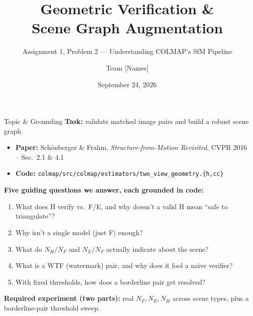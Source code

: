 \documentclass[11pt]{beamer}
\title[Geometric Verification \& Scene Graph Augmentation]{Geometric Verification \&\\ Scene Graph Augmentation}
\subtitle{Assignment 1, Problem 2 --- Understanding COLMAP's SfM Pipeline}
\author{Team [Names]}
\institute{E9-247: Learning for 3D Vision, IISc}
\date{September 24, 2026}
\begin{document}
\begin{frame}
  \titlepage
\end{frame}

\begin{frame}{Topic \& Grounding}
  \small
  \textbf{Task:} validate matched image pairs and build a robust scene graph
  \begin{itemize}\setlength{\itemsep}{1pt}
    \item \textbf{Paper:} Sch\"onberger \& Frahm, \emph{Structure-from-Motion Revisited}, CVPR 2016 --
          Sec.~2.1 \& 4.1
    \item \textbf{Code:} \texttt{colmap/src/colmap/estimators/two\_view\_geometry.\{h,cc\}}
  \end{itemize}
  \vspace{0.15cm}
  \textbf{Five guiding questions we answer, each grounded in code:}
  \begin{enumerate}\setlength{\itemsep}{1pt}
    \item What does H verify vs.\ F/E, and why doesn't a valid H mean ``safe to triangulate''?
    \item Why isn't a single model (just F) enough?
    \item What do $N_H/N_F$ and $N_E/N_F$ actually indicate about the scene?
    \item What is a WTF (watermark) pair, and why does it fool a naive verifier?
    \item With fixed thresholds, how does a borderline pair get resolved?
  \end{enumerate}
  \vspace{0.15cm}
  \textbf{Required experiment (two parts):} real $N_F,N_E,N_H$ across scene types,
  plus a borderline-pair threshold sweep.
\end{frame}
\end{document}
